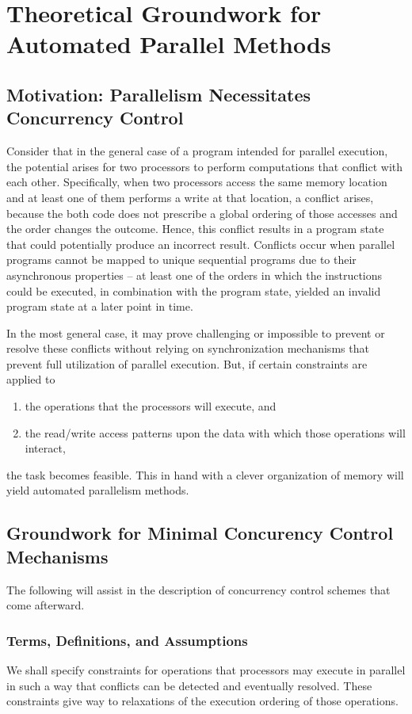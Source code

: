 \documentclass[pageno]{jpaper}
\begin{document}
\section{Theoretical Groundwork for Automated Parallel Methods}

\subsection{Motivation: Parallelism Necessitates Concurrency Control}
Consider that in the general case of a program intended for parallel execution,
the potential arises for two processors to perform computations that conflict
with each other. Specifically, when two processors access the same memory
location and at least one of them performs a write at that location, a conflict
arises, because the both code does not prescribe a global ordering of those
accesses and the order changes the outcome. Hence, this conflict results in a
program state that could potentially produce an incorrect result. Conflicts
occur when parallel programs cannot be mapped to unique sequential programs due
to their asynchronous properties -- at least one of the orders in which the
instructions could be executed, in combination with the program state, yielded
an invalid program state at a later point in time.

In the most general case, it may prove challenging or impossible to prevent or
resolve these conflicts without relying on synchronization mechanisms that
prevent full utilization of parallel execution. But, if certain constraints are
applied to
\begin{enumerate}
    \item the operations that the processors will execute, and
    \item the read/write access patterns upon the data with which those
        operations will interact,
\end{enumerate}

the task becomes feasible. This in hand with a clever organization of memory
will yield automated parallelism methods.

\subsection{Groundwork for Minimal Concurency Control Mechanisms}
The following will assist in the description of concurrency control schemes that
come afterward.

\subsubsection{Terms, Definitions, and Assumptions}
We shall specify constraints for operations that processors may execute in
parallel in such a way that conflicts can be detected and eventually resolved.
These constraints give way to relaxations of the execution ordering of those
operations.
\end{document}
